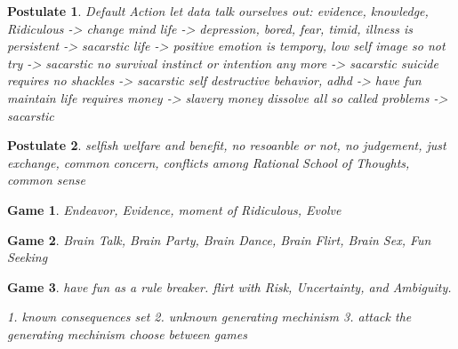 \documentclass{article}
\newtheorem{postulate}{Postulate}
\newtheorem{game}{Game}
\begin{document}
\begin{postulate}
    Default Action
    let data talk ourselves out:  evidence, knowledge, Ridiculous -> change mind
    life -> depression, bored, fear, timid, illness is persistent -> sacarstic
    life -> positive emotion is tempory, low self image so not  try -> sacarstic
    no survival instinct or intention any more -> sacarstic
    suicide requires no shackles -> sacarstic
    self destructive behavior, adhd -> have fun
    maintain life requires money -> slavery
    money dissolve all so called problems -> sacarstic
\end{postulate}

\begin{postulate}
    selfish welfare and benefit,
    no resoanble or not,
    no  judgement,
    just exchange,
    common concern,
    conflicts among {Rational School of Thoughts, common sense}
\end{postulate}

\begin{game}
    Endeavor,
    Evidence,
    moment of Ridiculous,
    Evolve
\end{game}

\begin{game}
    Brain Talk,
    Brain Party,
    Brain Dance,
    Brain Flirt,
    Brain Sex,
    Fun Seeking
\end{game}

\begin{game}
    have fun as a rule breaker.
    flirt with Risk, Uncertainty, and Ambiguity.

    1. known {consequences set}
    2. unknown generating mechinism
    3. attack the generating mechinism
        choose between games
\end{game}
\end{document}
